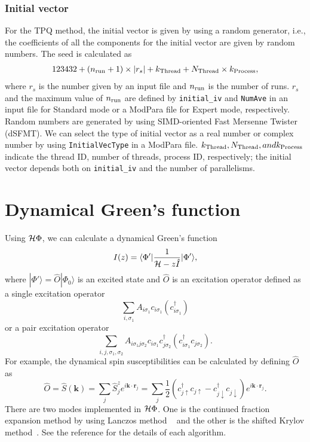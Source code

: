 \subsubsection*{Initial vector}
For the TPQ method, the initial vector is given by using a random generator, i.e., the coefficients of all the components for the initial vector are given by random numbers. The seed is calculated as 
\begin{align}
123432+(n_{\rm run}+1)\times  |r_s|+k_{\rm Thread}+N_{\rm Thread} \times k_{\rm Process},
\end{align}
where $r_s$ is the number given by an input file and $n_{\rm run}$ is the number of runs. $r_s$ and the maximum value of $n_{\rm run}$ are defined by \verb|initial_iv| and \verb|NumAve| in an input file for Standard mode or a ModPara file for Expert mode, respectively. Random numbers are generated by using SIMD-oriented Fast Mersenne Twister (dSFMT)\cite{Mutsuo2008}. We can select the type of initial vector as a real number or complex number by using \verb|InitialVecType| in a ModPara file.
$k_{\rm Thread}, N_{\rm Thread}, and k_{\rm Process}$ indicate 
the thread ID, number of threads, process ID, respectively;
the initial vector depends both on \verb|initial_iv| and the number of parallelisms.

\section{Dynamical Green's function}
Using ${\cal H}\Phi$, we can calculate a dynamical Green's function 
\begin{equation}
I(z) = \langle \Phi ' | \frac{1}{ {\cal H}- z\hat{I} } | \Phi '\rangle,
\end{equation}
where $|\Phi ' \rangle  = \hat{O} | \Phi _0 \rangle$ is an excited state and
$\hat{O}$ is an excitation operator defined as a single excitation operator
\begin{equation}
\sum_{i, \sigma_1} A_{i \sigma_1} c_{i \sigma_1} (c_{i\sigma_1}^{\dag})
\end{equation}
or a pair excitation operator
\begin{equation}
\sum_{i, j, \sigma_1, \sigma_2} A_{i \sigma_1 j \sigma_2} c_{i \sigma_1}c_{j \sigma_2}^{\dag} (c_{i\sigma_1}^{\dag}c_{j\sigma_2}).
\end{equation}
For example, the dynamical spin susceptibilities can be calculated by defining $\hat{O}$ as 
\begin{equation}
\hat{O} = \hat{S}({\bm k}) = \sum_{j}\hat{S}_j^z e^{i  {\bm k} \cdot \bm {r}_j} = \sum_{j}\frac{1}{2} (c_{j\uparrow}^{\dag}c_{j\uparrow}-c_{j\downarrow}^{\dag}c_{j\downarrow})e^{i  {\bm k} \cdot \bm {r}_j}.
\end{equation}
There are two modes implemented in ${\cal H}\Phi$. One is the continued fraction expansion method by using Lanczos method ~\cite{Dagotto} and the other is the shifted Krylov method~\cite{doi:10.1143/JPSJ.77.114713}.
See the reference for the details of each algorithm.

